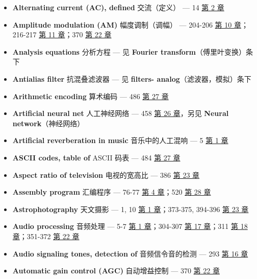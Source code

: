 \begin{itemize}
  \begin{itemize}
  \tightlist
  \item
    frequency domain：频域混叠 --- 196-200 
    \hyperref[ch-10]{第 10 章}；212-214, 220-222 
    \hyperref[ch-11]{第 11 章}；372  \hyperref[ch-22]{第 22
    章}
  \item
    in sampling：采样中的 --- 39-45  \hyperref[ch-03]{第 3 章}
  \item
    sinc function, equation for aliased：sinc 函数，混叠形式的公式 ---
    212-214  \hyperref[ch-11]{第 11 章}
  \item
    time domain：时域混叠 --- 194-196  \hyperref[ch-10]{第 10
    章}；300  \hyperref[ch-17]{第 17 章}
  \end{itemize}
\item
  \textbf{Alternating current (AC), defined} 交流（定义） --- 14
   \hyperref[ch-02]{第 2 章}
\item
  \textbf{Amplitude modulation (AM)} 幅度调制（调幅） --- 204-206
   \hyperref[ch-10]{第 10 章}；216-217 
  \hyperref[ch-11]{第 11 章}；370  \hyperref[ch-22]{第 22 章}
\item
  \textbf{Analysis equations} 分析方程 --- 见 \textbf{Fourier
  transform}（傅里叶变换）条下
\item
  \textbf{Antialias filter} 抗混叠滤波器 --- 见 \textbf{filters-
  analog}（滤波器，模拟）条下
\item
  \textbf{Arithmetic encoding} 算术编码 --- 486 
  \hyperref[ch-27]{第 27 章}
\item
  \textbf{Artificial neural net} 人工神经网络 --- 458 
  \hyperref[ch-26]{第 26 章}，另见 \textbf{Neural network}（神经网络）
\item
  \textbf{Artificial reverberation in music} 音乐中的人工混响 --- 5
   \hyperref[ch-01]{第 1 章}
\item
  \textbf{ASCII codes, table of} ASCII 码表 --- 484 
  \hyperref[ch-27]{第 27 章}
\item
  \textbf{Aspect ratio of television} 电视的宽高比 --- 386 
  \hyperref[ch-23]{第 23 章}
\item
  \textbf{Assembly program} 汇编程序 --- 76-77 
  \hyperref[ch-04]{第 4 章}；520  \hyperref[ch-28]{第 28 章}
\item
  \textbf{Astrophotography} 天文摄影 --- 1, 10 
  \hyperref[ch-01]{第 1 章}；373-375, 394-396 
  \hyperref[ch-23]{第 23 章}
\item
  \textbf{Audio processing} 音频处理 --- 5-7 
  \hyperref[ch-01]{第 1 章}；304-307  \hyperref[ch-17]{第 17
  章}；311  \hyperref[ch-18]{第 18 章}；351-372 
  \hyperref[ch-22]{第 22 章}
\item
  \textbf{Audio signaling tones, detection of} 音频信令音的检测 --- 293
   \hyperref[ch-16]{第 16 章}
\item
  \textbf{Automatic gain control (AGC)} 自动增益控制 --- 370 
  \hyperref[ch-22]{第 22 章}
\end{itemize}

